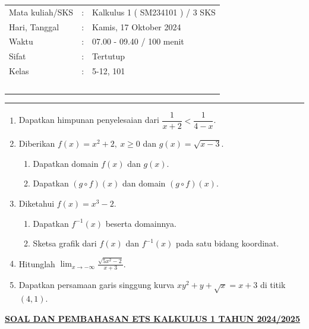 \documentclass[10pt,openany,a4paper]{article}
\theoremstyle{definition}
\theoremstyle{definition}
\theoremstyle{plain}
\begin{document}
    \begin{center}
	\begin{tabular}{lcl}
		Mata kuliah/SKS & : & Kalkulus 1 ( SM234101 ) / 3 SKS\\
		Hari, Tanggal & : & Kamis, 17 Oktober 2024\\
		Waktu & : & 07.00 - 09.40 / 100 menit\\
		Sifat & : & Tertutup\\
		Kelas & : & 5-12, 101\\
  ~
	\end{tabular}

    \noindent\rule{\textwidth}{2.pt}
        \end{center}
    \begin{enumerate}
    \item Dapatkan himpunan penyelesaian dari $\dfrac{1}{x+2}<\dfrac{1}{4-x}$.

    \item Diberikan $f(x)=x^2+2,\ x\geq 0$ dan $g(x)=\sqrt{x-3}$.
    \begin{enumerate}
        \item Dapatkan domain $f(x)$ dan $g(x)$.
        \item Dapatkan $(g\circ f)(x)$ dan domain $(g\circ f)(x)$.
    \end{enumerate}

    \item Diketahui $f(x)=x^3-2$.
    \begin{enumerate}
        \item Dapatkan $f^{-1}(x)$ beserta domainnya.
        \item Sketsa grafik dari $f(x)$ dan $f^{-1}(x)$ pada satu bidang koordinat.
    \end{enumerate}

    \item Hitunglah $\displaystyle\lim_{x\to-\infty}\frac{\sqrt{5x^2-2}}{x+3}$.

    \item Dapatkan persamaan garis singgung kurva $xy^2+y+\sqrt{x}=x+3$ di titik $(4,1)$.
\end{enumerate}
\newpage
 \begin{center}
	{\underline{\textbf{\MakeUppercase{Soal dan Pembahasan ETS Kalkulus 1 Tahun 2024/2025}}}}
    \end{center}
\end{document}
